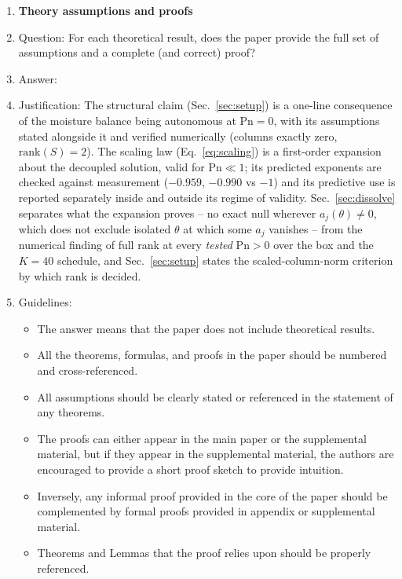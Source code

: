 \begin{enumerate}
\item {\bf Theory assumptions and proofs}
    \item[] Question: For each theoretical result, does the paper provide the full set of assumptions and a complete (and correct) proof?
    \item[] Answer: \answerYes{} %
    \item[] Justification: The structural claim (Sec.~\ref{sec:setup}) is a one-line consequence of the moisture balance being autonomous at $\mathrm{Pn}{=}0$, with its assumptions stated alongside it and verified numerically (columns exactly zero, $\mathrm{rank}(S){=}2$). The scaling law (Eq.~\ref{eq:scaling}) is a first-order expansion about the decoupled solution, valid for $\mathrm{Pn}\ll1$; its predicted exponents are checked against measurement ($-0.959$, $-0.990$ vs $-1$) and its predictive use is reported separately inside and outside its regime of validity. Sec.~\ref{sec:dissolve} separates what the expansion proves -- no exact null wherever $a_j(\theta)\neq0$, which does not exclude isolated $\theta$ at which some $a_j$ vanishes -- from the numerical finding of full rank at every \emph{tested} $\mathrm{Pn}{>}0$ over the box and the $K{=}40$ schedule, and Sec.~\ref{sec:setup} states the scaled-column-norm criterion by which rank is decided.
    \item[] Guidelines:
    \begin{itemize}
        \item The answer \answerNA{} means that the paper does not include theoretical results. 
        \item All the theorems, formulas, and proofs in the paper should be numbered and cross-referenced.
        \item All assumptions should be clearly stated or referenced in the statement of any theorems.
        \item The proofs can either appear in the main paper or the supplemental material, but if they appear in the supplemental material, the authors are encouraged to provide a short proof sketch to provide intuition. 
        \item Inversely, any informal proof provided in the core of the paper should be complemented by formal proofs provided in appendix or supplemental material.
        \item Theorems and Lemmas that the proof relies upon should be properly referenced. 
    \end{itemize}


\end{enumerate}
